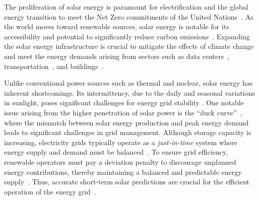 

The proliferation of solar energy is paramount for electrification and the global energy transition to meet the Net Zero commitments of the United Nations~\cite{sadhukhan2022net}. As the world moves toward renewable sources, solar energy is notable for its accessibility and potential to significantly reduce carbon emissions~\cite{sen2008solar}. Expanding the solar energy infrastructure is crucial to mitigate the effects of climate change~\cite{bashir2021enabling} and meet the energy demands arising from sectors such as data centers~\cite{agarwal2021redesigning}, transportation~\cite{lee2016shared}, and buildings~\cite{iyengar2017cloud}.

Unlike conventional power sources such as thermal and nuclear, solar energy has inherent shortcomings. Its intermittency, due to the daily and seasonal variations in sunlight, poses significant challenges for energy grid stability \cite{grid_management}. One notable issue arising from the higher penetration of solar power is the ``duck curve''~\cite{iyengar2016analyzing}, where the mismatch between solar energy production and peak energy demand leads to significant challenges in grid management. Although storage capacity is increasing, electricity grids typically operate as a \textit{just-in-time} system where energy supply and demand must be balanced~\cite{joskow2012creating}. To ensure grid efficiency, renewable operators must pay a deviation penalty to discourage unplanned energy contributions, thereby maintaining a balanced and predictable energy supply~\cite{yang2020penalty}. Thus, accurate short-term solar predictions are crucial for the efficient operation of the energy grid~\cite{iyengar2014solarcast}.





